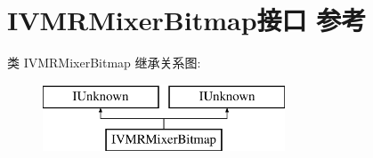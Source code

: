 \hypertarget{interface_i_v_m_r_mixer_bitmap}{}\section{I\+V\+M\+R\+Mixer\+Bitmap接口 参考}
\label{interface_i_v_m_r_mixer_bitmap}
类 I\+V\+M\+R\+Mixer\+Bitmap 继承关系图\+:\begin{figure}[H]
\begin{center}
\leavevmode
\includegraphics[height=2.000000cm]{interface_i_v_m_r_mixer_bitmap}
\end{center}
\end{figure}
